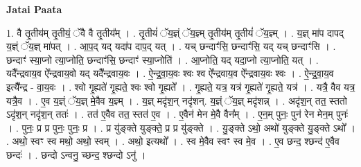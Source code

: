 \documentclass[17pt]{extarticle}
\begin{document}
\textbf{Jatai Paata} \newline

1. वै तृ॒तीय॑म् तृ॒तीयं॒ ॅवै वै तृ॒तीय᳚म् । . तृ॒तीयं॑ ॅय॒ज्ञ्ं ॅय॒ज्ञ्म् तृ॒तीय॑म् तृ॒तीयं॑ ॅय॒ज्ञ्म् । . य॒ज्ञ् मा॑प दापद् य॒ज्ञ्ं ॅय॒ज्ञ् मा॑पत् । . आ॒प॒द् यद् यदा॑प दाप॒द् यत् । . यच् छन्दाꣳ॑सि॒ छन्दाꣳ॑सि॒ यद् यच् छन्दाꣳ॑सि । . छन्दाꣳ॑ स्या॒प्नो त्या॒प्नोति॒ छन्दाꣳ॑सि॒ छन्दाꣳ॑ स्या॒प्नोति॑ । . आ॒प्नोति॒ यद् यदा॒प्नो त्या॒प्नोति॒ यत् । . यदै᳚न्द्रवाय॒व ऐ᳚न्द्रवाय॒वो यद् यदै᳚न्द्रवाय॒वः । . ऐ॒न्द्र॒वा॒य॒वः श्वः श्व ऐ᳚न्द्रवाय॒व ऐ᳚न्द्रवाय॒वः श्वः । . ऐ॒न्द्र॒वा॒य॒व इत्यै᳚न्द्र - वा॒य॒वः । . श्वो गृ॒ह्यते॑ गृ॒ह्यते॒ श्वः श्वो गृ॒ह्यते᳚ । . गृ॒ह्यते॒ यत्र॒ यत्र॑ गृ॒ह्यते॑ गृ॒ह्यते॒ यत्र॑ । . यत्रै॒ वैव यत्र॒ यत्रै॒व । . ए॒व य॒ज्ञ्ं ॅय॒ज्ञ् मे॒वैव य॒ज्ञ्म् । . य॒ज्ञ् मदृ॑श॒न् नदृ॑शन्. य॒ज्ञ्ं ॅय॒ज्ञ् मदृ॑शन्न् । . अदृ॑श॒न् तत॒ स्ततो ऽदृ॑श॒न् नदृ॑श॒न् ततः॑ । . तत॑ ए॒वैव तत॒ स्तत॑ ए॒व । . ए॒वैन॑ मेन मे॒वै वैन᳚म् । . ए॒न॒म् पुनः॒ पुन॑ रेन मेन॒म् पुनः॑ । . पुनः॒ प्र प्र पुनः॒ पुनः॒ प्र । . प्र यु॑ङ्क्ते युङ्क्ते॒ प्र प्र यु॑ङ्क्ते । . यु॒ङ्क्ते ऽथो॒ अथो॑ युङ्क्ते यु॒ङ्क्ते ऽथो᳚ । . अथो॒ स्वꣳ स्व मथो॒ अथो॒ स्वम् । . अथो॒ इत्यथो᳚ । . स्व मे॒वैव स्वꣳ स्व मे॒व । . ए॒व छन्द॒ श्छन्द॑ ए॒वैव छन्दः॑ । . छन्दो ऽन्वनु॒ च्छन्द॒ श्छन्दो ऽनु॑ । \newline
\end{document}
